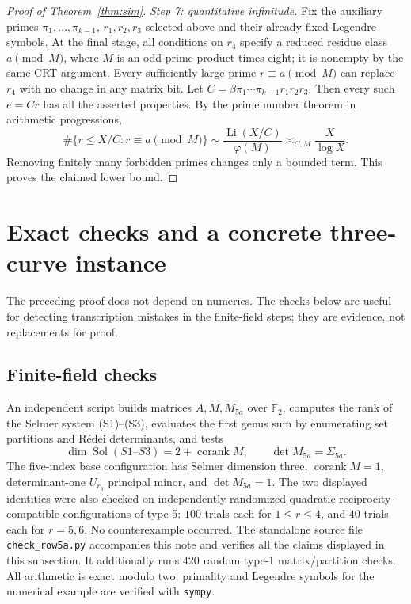 \documentclass[11pt,a4paper]{article}
\theoremstyle{definition}
\newcommand{\FF}{\mathbb F_2}
\newcommand{\corank}{\operatorname{corank}}
\begin{document}
\begin{proof}[Proof of Theorem~\ref{thm:sim}]
\emph{Step 7: quantitative infinitude.}
Fix the auxiliary primes $\pi_1,\ldots,\pi_{k-1}$,
$r_1,r_2,r_3$ selected above and their already fixed
Legendre symbols.  At the final stage, all conditions on
$r_4$ specify a reduced residue class
$a\pmod M$, where $M$ is an odd prime product times
eight; it is nonempty by the same CRT argument.
Every sufficiently large prime $r\equiv a\pmod M$
can replace $r_4$ with no change in any matrix bit.
Let $C=\beta\pi_1\cdots\pi_{k-1}r_1r_2r_3$.
Then every such $e=Cr$ has all the asserted properties.
By the prime number theorem in arithmetic progressions,
\[
 \#\{r\le X/C:r\equiv a\pmod M\}
       \sim\frac{\operatorname{Li}(X/C)}{\varphi(M)}
       \asymp_{C,M}\frac{X}{\log X}.
\]
Removing finitely many forbidden primes changes only a
bounded term.  This proves the claimed lower bound.
\end{proof}

\section{Exact checks and a concrete three-curve instance}\label{sec:checks}

The preceding proof does not depend on numerics.  The checks
below are useful for detecting transcription mistakes in the
finite-field steps; they are evidence, not replacements for
proof.

\subsection{Finite-field checks}

An independent script builds matrices $A,M,M_{5a}$ over
$\FF$, computes the rank of the Selmer system
(S1)--(S3), evaluates the first genus sum by enumerating
set partitions and R\'edei determinants, and tests
\[
  \dim\operatorname{Sol}(S1\text{--}S3)=2+\corank M,
           \qquad\det M_{5a}=\Sigma_{5a}.
\]
The five-index base configuration has Selmer dimension
three, $\corank M=1$, determinant-one $U_{r_3}$ principal
minor, and $\det M_{5a}=1$.
The two displayed identities were also checked on
independently randomized quadratic-reciprocity-compatible
configurations of type 5: $100$ trials each for
$1\le r\le4$, and $40$ trials each for $r=5,6$.
No counterexample occurred.  The standalone source file \texttt{check\_row5a.py} accompanies this
note and verifies all the claims displayed in this subsection.
It additionally runs $420$ random type-1 matrix/partition checks.
All arithmetic is exact modulo two; primality and Legendre symbols
for the numerical example are verified with \texttt{sympy}.
\end{document}
